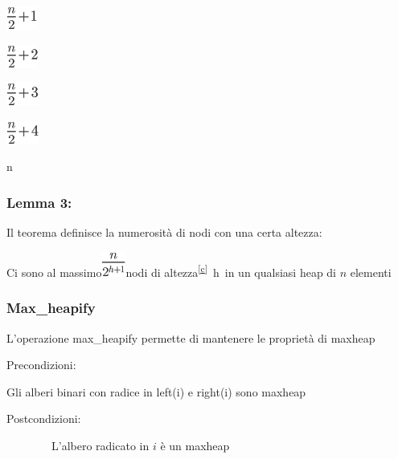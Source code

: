\documentclass{article}
\begin{document}
{\includegraphics{images/image125.png}

\includegraphics{images/image126.png}

\includegraphics{images/image127.png}

\includegraphics{images/image128.png}

{n}

{}

\hypertarget{h.wlc8yrs7inpk}{\subsubsection{\texorpdfstring{{Lemma 3:}}{Lemma 3:}}\label{h.wlc8yrs7inpk}}

{}

{Il teorema definisce la numerosità di nodi con una certa altezza:}

{Ci sono al massimo}\includegraphics{images/image129.png}{nodi di altezza}\textsuperscript{\protect\hyperlink{cmnt3}{{[}c{]}}}{~}{h}{~in
un qualsiasi heap di $n$ elementi}

\hypertarget{h.t1rcecigqmbx}{\subsubsection{\texorpdfstring{{Max\_heapify}}{Max\_heapify}}\label{h.t1rcecigqmbx}}

{L'operazione max\_heapify permette di mantenere le proprietà di maxheap}

{}

{Precondizioni}{:}

{Gli alberi binari con radice in left(i) e right(i) sono maxheap}

{Postcondizioni}{:}

{~~~~~~~~L'albero radicato in $i$ è un maxheap}

}
\end{document}
